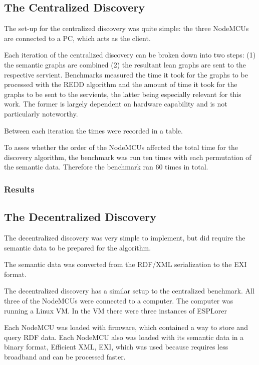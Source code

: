 \subsection{The Centralized Discovery}

The set-up for the centralized discovery was quite simple: the three NodeMCUs are connected to a PC, which acts as the client.

Each iteration of the centralized discovery can be broken down into two steps: (1) the semantic graphs are combined (2) the resultant lean graphs are sent to the respective servient. Benchmarks measured the time it took for the graphs to be processed with the REDD algorithm and the amount of time it took for the graphs to be sent to the servients, the latter being especially relevant for this work. The former is largely dependent on hardware capability and is not particularly noteworthy.



Between each iteration the times were recorded in a table. 


To asses whether the order of the NodeMCUs affected the total time for the discovery algorithm, the benchmark was run ten times with each permutation of the semantic data. Therefore the benchmark ran 60 times in total.



\subsubsection{Results}


\subsection{The Decentralized Discovery}
The decentralized discovery was very simple to implement, but did require the semantic data to be prepared for the algorithm.

The semantic data was converted from the RDF/XML serialization to the EXI format.




The decentralized discovery has a similar setup to the centralized benchmark. All three of the NodeMCUs were connected to a computer. The computer was running a Linux VM. In the VM there were three instances of ESPLorer 

Each NodeMCU was loaded with firmware, which contained a way to store and query RDF data. Each NodeMCU also was loaded with its semantic data in a binary format, Efficient XML, EXI, which was used because requires less broadband and can be processed faster. \cite{}  

